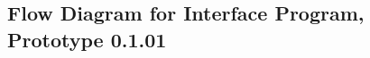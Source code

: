 \subsection{Flow Diagram for Interface Program, Prototype 0.1.01}
\label{interfaceflow}
\begin{figure}[H]
\centering
{}
\hspace{72pt}
\end{figure}
